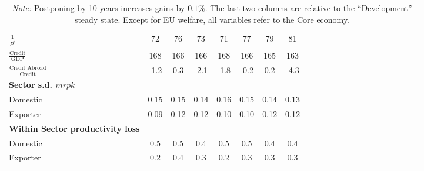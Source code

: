 \begin{table}[!t]
{\begin{tabular}{l ccc ccc ccc ccc ccc ccc ccc}
$\frac{1}{P^*}$ & 72 & 76 & 73 & 71 & 77 & 79 & 81 \\
$\frac{\text{Credit}}{\text{GDP}}$ & 168 & 166 & 166 & 168 & 166 & 165 & 163\\
$\frac{\text{Credit Abroad}}{\text{Credit}}$ & -1.2 & 0.3 & -2.1 & -1.8 & -0.2& 0.2 & -4.3\\[1ex]
\textbf{Sector s.d. $mrpk$} & & & \\
 Domestic & 0.15 & 0.15 & 0.14 &0.16 & 0.15 & 0.14 & 0.13 \\
 Exporter& 0.09 & 0.12 & 0.12 &0.10 & 0.10 & 0.12 & 0.12 \\[1ex]
\textbf{Within Sector productivity loss} & & & \\
 Domestic  & 0.5 & 0.5 & 0.4 & 0.5 & 0.5 & 0.4 & 0.4 \\
 Exporter & 0.2 & 0.4 & 0.3 & 0.2 & 0.3 & 0.3 & 0.3 \\
\hline
\end{tabular} }
\parbox{0.85\textwidth}{\caption*{\scriptsize \textit{Note:}  Postponing by 10 years increases gains by $0.1 \%$. The last two columns are relative to the ``Development'' steady state. Except for EU welfare, all variables refer to the Core economy.}}
\end{table}
